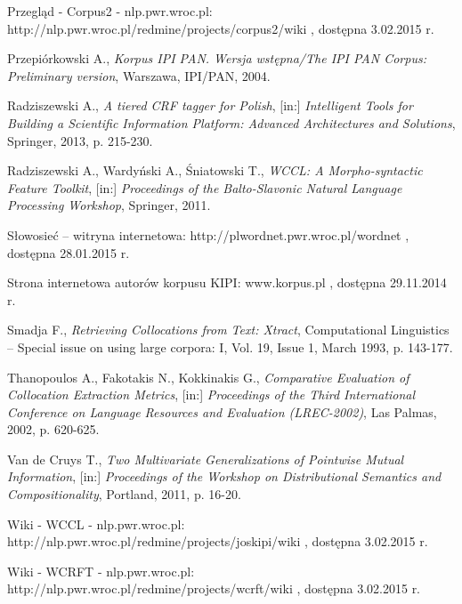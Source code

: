 \begin{thebibliography}{9}
Przegląd - Corpus2 - nlp.pwr.wroc.pl: http://nlp.pwr.wroc.pl/redmine/projects/corpus2/wiki , dostępna 3.02.2015 r.

Przepiórkowski A., \emph{Korpus IPI PAN. Wersja wstępna/The IPI PAN Corpus: Preliminary version}, Warszawa, IPI/PAN, 2004.

Radziszewski A., \emph{A tiered CRF tagger for Polish}, [in:] \emph{Intelligent Tools for Building a Scientific Information Platform: Advanced Architectures and Solutions}, Springer, 2013, p. 215-230.

Radziszewski A., Wardyński A., Śniatowski T., \emph{WCCL: A Morpho-syntactic Feature Toolkit}, [in:] \emph{Proceedings of the Balto-Slavonic Natural Language Processing Workshop}, Springer, 2011.

Słowosieć – witryna internetowa: http://plwordnet.pwr.wroc.pl/wordnet , dostępna 28.01.2015 r.

Strona internetowa autorów korpusu KIPI: www.korpus.pl , dostępna 29.11.2014 r.

Smadja F., \emph{Retrieving Collocations from Text: Xtract}, Computational Linguistics – Special issue on using large corpora: I, Vol. 19, Issue 1, March 1993, p. 143-177.

Thanopoulos A., Fakotakis N., Kokkinakis G., \emph{Comparative Evaluation of Collocation Extraction Metrics}, [in:] \emph{Proceedings of the Third International Conference on Language Resources and Evaluation (LREC-2002)}, Las Palmas, 2002, p. 620-625.

Van de Cruys T., \emph{Two Multivariate Generalizations of Pointwise Mutual Information}, [in:] \emph{Proceedings of the Workshop on Distributional Semantics and Compositionality}, Portland, 2011, p. 16-20.
	
Wiki - WCCL - nlp.pwr.wroc.pl: http://nlp.pwr.wroc.pl/redmine/projects/joskipi/wiki , dostępna 3.02.2015 r.
	
Wiki - WCRFT - nlp.pwr.wroc.pl: http://nlp.pwr.wroc.pl/redmine/projects/wcrft/wiki , dostępna 3.02.2015 r.

\end{thebibliography}